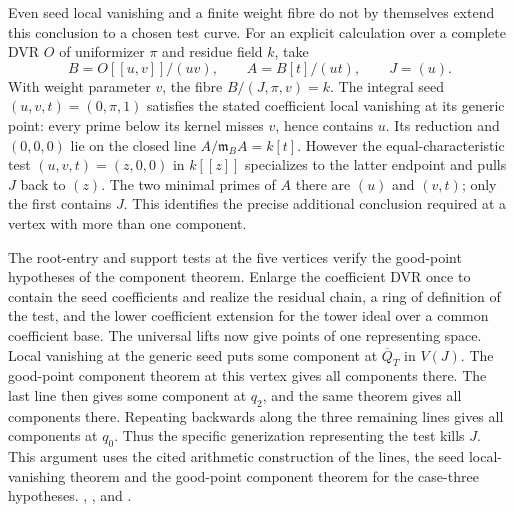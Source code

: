 Even seed local vanishing and a finite weight fibre do not by
themselves extend this conclusion to a chosen test curve. For an
explicit calculation over a complete DVR \(O\) of uniformizer
\(\pi\) and residue field \(k\), take
\[
 B=O[[u,v]]/(uv),\qquad A=B[t]/(ut),\qquad J=(u).
\]
With weight parameter \(v\), the fibre \(B/(J,\pi,v)=k\).
The integral seed \((u,v,t)=(0,\pi,1)\) satisfies the stated
coefficient local vanishing at its generic point: every prime
below its kernel misses \(v\), hence contains \(u\). Its reduction
and \((0,0,0)\) lie on the closed line \(A/\mathfrak m_B A=k[t]\).
However the equal-characteristic test
\((u,v,t)=(z,0,0)\) in \(k[[z]]\) specializes to the latter
endpoint and pulls \(J\) back to \((z)\). The two minimal primes
of \(A\) there are \((u)\) and \((v,t)\); only the first contains
\(J\). This identifies the precise additional conclusion required
at a vertex with more than one component.

The root-entry and support tests at the five vertices verify the
good-point hypotheses of the component theorem. Enlarge the coefficient
DVR once to contain the seed coefficients and realize the residual
chain, a ring of definition of the test, and the lower coefficient
extension for the tower ideal over a common coefficient base.
The universal lifts now give points of one representing space. Local
vanishing at the generic seed puts some component at
\(\overline Q_T\) in \(V(J)\). The good-point component theorem at this
vertex gives all components there. The last line then gives some
component at \(q_2\), and the same theorem gives all components
there. Repeating backwards along the three remaining lines gives all
components at \(q_0\). Thus the specific generization representing
the test kills \(J\). This argument uses the cited arithmetic
construction of the lines, the seed local-vanishing theorem and
the good-point component theorem for the case-three hypotheses.
,
,
and .

